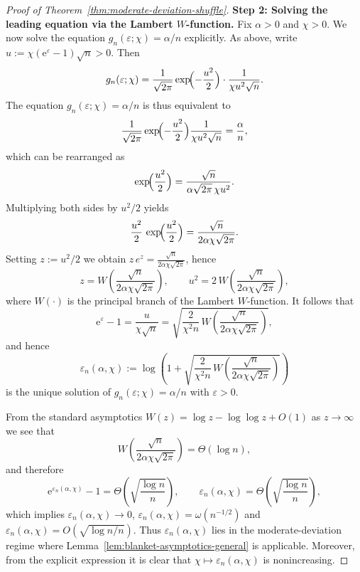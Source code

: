 \documentclass{article}
\theoremstyle{plain}
\theoremstyle{definition}
\begin{document}
\begin{proof}[Proof of Theorem~\ref{thm:moderate-deviation-shuffle}]
\medskip\noindent
\textbf{Step 2: Solving the leading equation via the Lambert $W$-function.}
Fix $\alpha>0$ and $\chi>0$. We now solve the equation
$g_n(\varepsilon;\chi)=\alpha/n$ explicitly. As above, write
$u:=\chi(\mathrm e^\varepsilon-1)\sqrt{n}>0$. Then
\[
  g_n(\varepsilon;\chi)
  =
  \frac{1}{\sqrt{2\pi}}
  \exp\!\Bigl(-\frac{u^2}{2}\Bigr)
  \cdot
  \frac{1}{\chi u^2\sqrt{n}}.
\]
The equation $g_n(\varepsilon;\chi)=\alpha/n$ is thus equivalent to
\[
  \frac{1}{\sqrt{2\pi}}
  \exp\!\Bigl(-\frac{u^2}{2}\Bigr)
  \frac{1}{\chi u^2\sqrt{n}}
  = \frac{\alpha}{n},
\]
which can be rearranged as
\[
  \exp\!\Bigl(\frac{u^2}{2}\Bigr)
  =
  \frac{\sqrt{n}}{\alpha\sqrt{2\pi}\,\chi u^2}.
\]
Multiplying both sides by $u^2/2$ yields
\[
  \frac{u^2}{2}\,
  \exp\!\Bigl(\frac{u^2}{2}\Bigr)
  =
  \frac{\sqrt{n}}{2\alpha\chi\sqrt{2\pi}}.
\]
Setting $z:=u^2/2$ we obtain $z\,e^z=\frac{\sqrt{n}}{2\alpha\chi\sqrt{2\pi}}$,
hence
\[
  z = W\!\left(
    \frac{\sqrt{n}}{2\alpha\chi\sqrt{2\pi}}
  \right),
  \qquad
  u^2
  =
  2\,W\!\left(
    \frac{\sqrt{n}}{2\alpha\chi\sqrt{2\pi}}
  \right),
\]
where $W(\cdot)$ is the principal branch of the Lambert $W$-function. It
follows that
\[
  \mathrm e^\varepsilon-1
  = \frac{u}{\chi\sqrt{n}}
  =
  \sqrt{
    \frac{2}{\chi^2 n}\,
    W\!\left(
      \frac{\sqrt{n}}{2\alpha\chi\sqrt{2\pi}}
    \right)
  },
\]
and hence
\[
  \varepsilon_n(\alpha,\chi)
  :=
  \log\left(
    1+
    \sqrt{
      \frac{2}{\chi^2 n}\,
      W\!\left(
        \frac{\sqrt{n}}{2\alpha\chi\sqrt{2\pi}}
      \right)
    }
  \right)
\]
is the unique solution of $g_n(\varepsilon;\chi)=\alpha/n$ with
$\varepsilon>0$.

From the standard asymptotics $W(z)=\log z-\log\log z+O(1)$ as $z\to\infty$ we
see that
\[
  W\!\left(
    \frac{\sqrt{n}}{2\alpha\chi\sqrt{2\pi}}
  \right)
  = \Theta(\log n),
\]
and therefore
\[
  \mathrm e^{\varepsilon_n(\alpha,\chi)}-1
  =
  \Theta\left(\sqrt{\frac{\log n}{n}}\right),
  \qquad
  \varepsilon_n(\alpha,\chi)
  =
  \Theta\left(\sqrt{\frac{\log n}{n}}\right),
\]
which implies $\varepsilon_n(\alpha,\chi)\to0$,
$\varepsilon_n(\alpha,\chi)=\omega(n^{-1/2})$ and
$\varepsilon_n(\alpha,\chi)=O(\sqrt{\log n/n})$. Thus $\varepsilon_n(\alpha,\chi)$
lies in the moderate-deviation regime where
Lemma~\ref{lem:blanket-asymptotics-general} is applicable. Moreover, from
the explicit expression it is clear that $\chi\mapsto\varepsilon_n(\alpha,\chi)$
is nonincreasing.


\end{proof}
\end{document}
